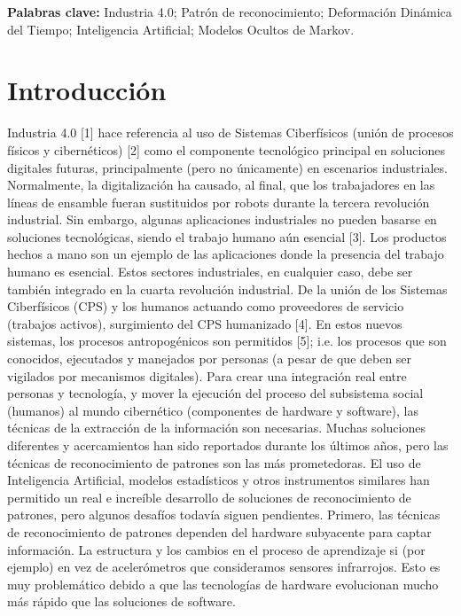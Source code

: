 \documentclass[a4paper]{article}
\begin{document}
\begin{center}
    
        \textbf{Palabras clave:} Industria 4.0; Patrón de reconocimiento; Deformación Dinámica del Tiempo; Inteligencia Artificial; Modelos Ocultos de Markov.

    
    \end{center}



\section{Introducción}
Industria 4.0 [1] hace referencia al uso de Sistemas Ciberfísicos (unión de procesos físicos y cibernéticos) [2] como el componente tecnológico principal en soluciones digitales futuras, principalmente (pero no únicamente) en escenarios industriales. Normalmente, la digitalización ha causado, al final, que los trabajadores en las líneas de ensamble fueran sustituidos por robots durante la tercera revolución industrial.
Sin embargo, algunas aplicaciones industriales no pueden basarse en soluciones tecnológicas, siendo el trabajo humano aún esencial [3]. Los productos hechos a mano son un ejemplo de las aplicaciones donde la presencia del trabajo humano es esencial. Estos sectores industriales, en cualquier caso, debe ser también integrado en la cuarta revolución industrial. De la unión de los Sistemas Ciberfísicos (CPS) y los humanos actuando como proveedores de servicio (trabajos activos), surgimiento del CPS humanizado [4]. En estos nuevos sistemas, los procesos antropogénicos son permitidos [5]; i.e. los procesos que son conocidos, ejecutados y manejados por personas (a pesar de que deben ser vigilados por mecanismos digitales).
Para crear una integración real entre personas y tecnología, y mover la ejecución del proceso del subsistema social (humanos) al mundo cibernético (componentes de hardware y software), las técnicas de la extracción de la información son necesarias. Muchas soluciones diferentes y acercamientos han sido reportados durante los últimos años, pero las técnicas de reconocimiento de patrones son las más prometedoras.
El uso de Inteligencia Artificial, modelos estadísticos y otros instrumentos similares han permitido un real e increíble desarrollo de soluciones de reconocimiento de patrones, pero algunos desafíos todavía siguen pendientes.
Primero, las técnicas de reconocimiento de patrones dependen del hardware subyacente para captar información. La estructura y los cambios en el proceso de aprendizaje si (por ejemplo) en vez de acelerómetros que  consideramos sensores infrarrojos. Esto es muy problemático debido a que las tecnologías de hardware evolucionan mucho más rápido que las soluciones de software.
\end{document}
